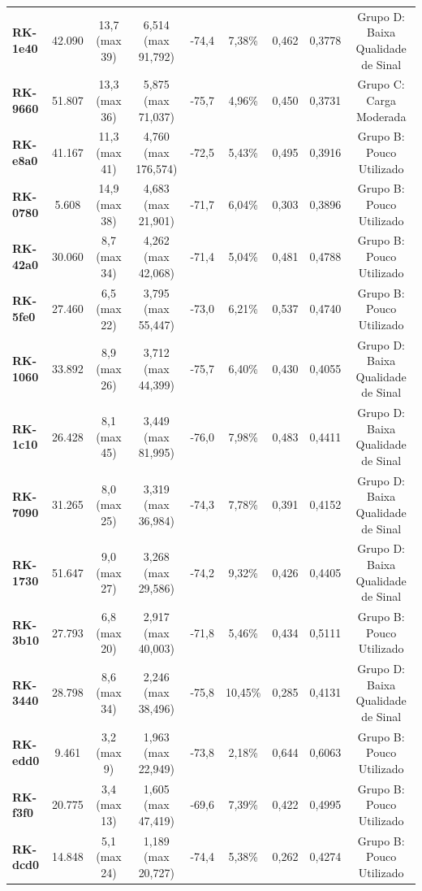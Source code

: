 \begin{table}[H]
{{\begin{tabular}{lcccccccc}
      \textbf{RK-1e40} & 42.090 & 13,7 (max 39) & 6,514 (max 91,792) & -74,4 & 7,38\% & 0,462 & 0,3778 & Grupo D: Baixa Qualidade de Sinal \\
      \textbf{RK-9660} & 51.807 & 13,3 (max 36) & 5,875 (max 71,037) & -75,7 & 4,96\% & 0,450 & 0,3731 & Grupo C: Carga Moderada \\
      \textbf{RK-e8a0} & 41.167 & 11,3 (max 41) & 4,760 (max 176,574) & -72,5 & 5,43\% & 0,495 & 0,3916 & Grupo B: Pouco Utilizado \\
      \textbf{RK-0780} & 5.608 & 14,9 (max 38) & 4,683 (max 21,901) & -71,7 & 6,04\% & 0,303 & 0,3896 & Grupo B: Pouco Utilizado \\
      \textbf{RK-42a0} & 30.060 & 8,7 (max 34) & 4,262 (max 42,068) & -71,4 & 5,04\% & 0,481 & 0,4788 & Grupo B: Pouco Utilizado \\
      \textbf{RK-5fe0} & 27.460 & 6,5 (max 22) & 3,795 (max 55,447) & -73,0 & 6,21\% & 0,537 & 0,4740 & Grupo B: Pouco Utilizado \\
      \textbf{RK-1060} & 33.892 & 8,9 (max 26) & 3,712 (max 44,399) & -75,7 & 6,40\% & 0,430 & 0,4055 & Grupo D: Baixa Qualidade de Sinal \\
      \textbf{RK-1c10} & 26.428 & 8,1 (max 45) & 3,449 (max 81,995) & -76,0 & 7,98\% & 0,483 & 0,4411 & Grupo D: Baixa Qualidade de Sinal \\
      \textbf{RK-7090} & 31.265 & 8,0 (max 25) & 3,319 (max 36,984) & -74,3 & 7,78\% & 0,391 & 0,4152 & Grupo D: Baixa Qualidade de Sinal \\
      \textbf{RK-1730} & 51.647 & 9,0 (max 27) & 3,268 (max 29,586) & -74,2 & 9,32\% & 0,426 & 0,4405 & Grupo D: Baixa Qualidade de Sinal \\
      \textbf{RK-3b10} & 27.793 & 6,8 (max 20) & 2,917 (max 40,003) & -71,8 & 5,46\% & 0,434 & 0,5111 & Grupo B: Pouco Utilizado \\
      \textbf{RK-3440} & 28.798 & 8,6 (max 34) & 2,246 (max 38,496) & -75,8 & 10,45\% & 0,285 & 0,4131 & Grupo D: Baixa Qualidade de Sinal \\
      \textbf{RK-edd0} & 9.461 & 3,2 (max 9) & 1,963 (max 22,949) & -73,8 & 2,18\% & 0,644 & 0,6063 & Grupo B: Pouco Utilizado \\
      \textbf{RK-f3f0} & 20.775 & 3,4 (max 13) & 1,605 (max 47,419) & -69,6 & 7,39\% & 0,422 & 0,4995 & Grupo B: Pouco Utilizado \\
      \textbf{RK-dcd0} & 14.848 & 5,1 (max 24) & 1,189 (max 20,727) & -74,4 & 5,38\% & 0,262 & 0,4274 & Grupo B: Pouco Utilizado \\
      \bottomrule
    \end{tabular}%
  }%
}{%
}
\end{table}

